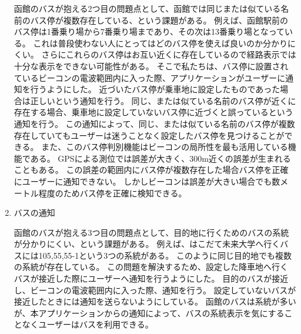 \documentclass[openany,11pt,papersize]{jsbook}
\begin{document}
\begin{enumerate}
函館のバスが抱える2つ目の問題点として、函館では同じまたは似ている名前のバス停が複数存在している、という課題がある。
例えば、函館駅前のバス停は1番乗り場から7番乗り場まであり、その次は13番乗り場となっている。
これは普段使わない人にとってはどのバス停を使えば良いのか分かりにくい。
さらにこれらのバス停はお互い近くに存在しているので経路表示では十分な表示をできない可能性がある。
そこで私たちは、バス停に設置されているビーコンの電波範囲内に入った際、アプリケーションがユーザーに通知を行うようにした。
近づいたバス停が乗車地に設定したものであった場合は正しいという通知を行う。
同じ、または似ている名前のバス停が近くに存在する場合、乗車地に設定していないバス停に近づくと誤っているという通知を行う。
この通知によって、同じ、または似ている名前のバス停が複数存在していてもユーザーは迷うことなく設定したバス停を見つけることができる。
また、このバス停判別機能はビーコンの局所性を最も活用している機能である。
GPSによる測位では誤差が大きく、300m近くの誤差が生まれることもある。
この誤差の範囲内にバス停が複数存在した場合バス停を正確にユーザーに通知できない。
しかしビーコンは誤差が大きい場合でも数メートル程度のためバス停を正確に検知できる。

\item バスの通知\mbox{}

函館のバスが抱える3つ目の問題点として、目的地に行くためのバスの系統が分かりにくい、という課題がある。
例えば、はこだて未来大学へ行くバスには105,55,55-1という3つの系統がある。
このように同じ目的地でも複数の系統が存在している。
この問題を解決するため、設定した降車地へ行くバスが接近した際にユーザーへ通知を行うようにした。
目的のバスが接近し、ビーコンの電波範囲内に入った際、通知を行う。
設定していないバスが接近したときには通知を送らないようにしている。
函館のバスは系統が多いが、本アプリケーションからの通知によって、バスの系統表示を気にすることなくユーザーはバスを利用できる。

\end{enumerate}

\end{document}
